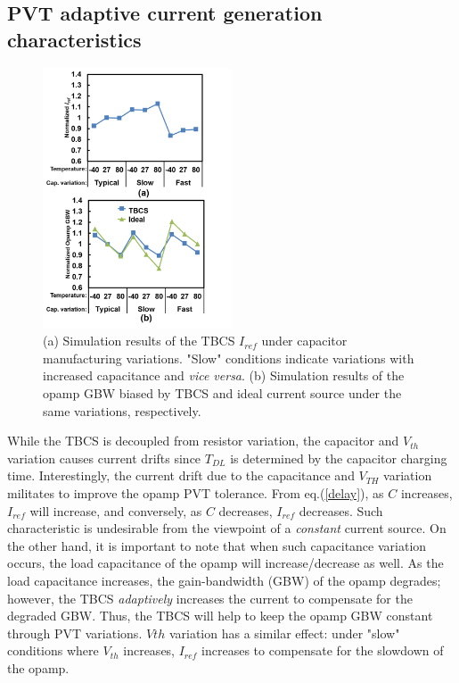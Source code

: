 \documentclass[paper]{ieice}
\begin{document}
\subsection{PVT adaptive current generation characteristics}
\begin{figure}[!t]
\centering
 \includegraphics[width=0.5\textwidth]{figs/iref_var.png}
  \caption{(a) Simulation results of the TBCS $I_{ref}$ under capacitor manufacturing variations. "Slow" conditions indicate variations with increased capacitance and \textit{vice versa}.  (b) Simulation results of the opamp GBW biased by TBCS and ideal current source under the same variations, respectively.}
\label{cvar}
\end{figure}

\qquad While the TBCS is decoupled from resistor variation, the capacitor and $V_{th}$ variation causes current drifts since $T_{DL}$ is determined by the capacitor charging time. Interestingly, the current drift due to the capacitance and $V_{TH}$ variation militates to improve the opamp PVT tolerance.
From eq.(\ref{delay}), as $C$ increases, $I_{ref}$ will increase, and conversely, as $C$ decreases, $I_{ref}$ decreases. Such characteristic is undesirable from the viewpoint of a \textit{constant} current source. On the other hand, it is important to note that when such capacitance variation occurs, the load capacitance of the opamp will increase/decrease as well. As the load capacitance increases, the gain-bandwidth (GBW) of the opamp degrades; however, the TBCS \textit{adaptively} increases the current to compensate for the degraded GBW. Thus, the TBCS will help to keep the opamp GBW constant through PVT variations. $V{th}$ variation has a similar effect: under "slow" conditions where $V_{th}$ increases, $I_{ref}$ increases to compensate for the slowdown of the opamp.
\end{document}
